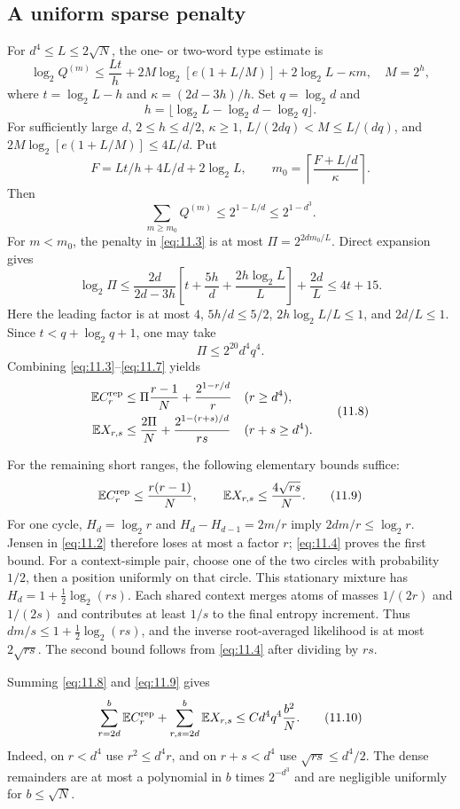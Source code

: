 \documentclass[11pt]{article}
\theoremstyle{remark}
\begin{document}
\subsection{A uniform sparse penalty}
For $d^4\le L\le2\sqrt N$, the one- or two-word type estimate is
\[
 \log_2 Q^{(m)}
 \le \frac{Lt}{h}
 +2M\log_2[e(1+L/M)]+2\log_2L-\kappa m,
 \quad M=2^h,
 \tag{11.5}\label{eq:11.5}
\]
where $t=\log_2L-h$ and $\kappa=(2d-3h)/h$.
Set $q=\log_2d$ and
\[
 h=\lfloor\log_2L-\log_2d-\log_2q\rfloor.
\]
For sufficiently large $d$, $2\le h\le d/2$, $\kappa\ge1$,
$L/(2dq)<M\le L/(dq)$, and
$2M\log_2[e(1+L/M)]\le4L/d$.
Put
\[
 F=Lt/h+4L/d+2\log_2L,
 \qquad m_0=\left\lceil\frac{F+L/d}{\kappa}\right\rceil.
\]
Then
\[
 \sum_{m\ge m_0}Q^{(m)}
 \le2^{1-L/d}\le2^{1-d^3}.
 \tag{11.6}\label{eq:11.6}
\]
For $m<m_0$, the penalty in \eqref{eq:11.3} is at most
$\Pi=2^{2dm_0/L}$. Direct expansion gives
\[
 \log_2\Pi
 \le\frac{2d}{2d-3h}
 \left[t+\frac{5h}{d}+\frac{2h\log_2L}{L}\right]+\frac{2d}{L}
 \le4t+15.
\]
Here the leading factor is at most $4$, $5h/d\le5/2$,
$2h\log_2L/L\le1$, and $2d/L\le1$.
Since $t<q+\log_2q+1$, one may take
\[
 \Pi\le 2^{20}d^4q^4.
 \tag{11.7}\label{eq:11.7}
\]
Combining \eqref{eq:11.3}--\eqref{eq:11.7} yields
\[
 \begin{aligned}
 \mathbb EC_r^{\rm rep}
 &\le\Pi\frac{r-1}{N}+\frac{2^{1-r/d}}r
 &&(r\ge d^4),\\
 \mathbb EX_{r,s}
 &\le\frac{2\Pi}{N}+\frac{2^{1-(r+s)/d}}{rs}
 &&(r+s\ge d^4).
 \end{aligned}
 \tag{11.8}\label{eq:11.8}
\]

For the remaining short ranges, the following elementary bounds suffice:
\[
 \mathbb EC_r^{\rm rep}\le\frac{r(r-1)}N,
 \qquad
 \mathbb EX_{r,s}\le\frac{4\sqrt{rs}}N.
 \tag{11.9}\label{eq:11.9}
\]
For one cycle, $H_d=\log_2r$ and $H_d-H_{d-1}=2m/r$ imply
$2dm/r\le\log_2r$. Jensen in \eqref{eq:11.2} therefore loses at most a
factor $r$; \eqref{eq:11.4} proves the first bound.
For a context-simple pair, choose one of the two circles with probability
$1/2$, then a position uniformly on that circle. This stationary mixture
has $H_d=1+\tfrac12\log_2(rs)$. Each shared context merges atoms of masses
$1/(2r)$ and $1/(2s)$ and contributes at least $1/s$ to the final entropy
increment. Thus $dm/s\le1+\tfrac12\log_2(rs)$, and the inverse root-averaged
likelihood is at most $2\sqrt{rs}$. The second bound follows from
\eqref{eq:11.4} after dividing by $rs$.

Summing \eqref{eq:11.8} and \eqref{eq:11.9} gives
\[
 \sum_{r=2d}^b\mathbb EC_r^{\rm rep}
 +\sum_{r,s=2d}^b\mathbb EX_{r,s}
 \le C d^4q^4\frac{b^2}{N}.
 \tag{11.10}\label{eq:11.10}
\]
Indeed, on $r<d^4$ use $r^2\le d^4r$, and on $r+s<d^4$ use
$\sqrt{rs}\le d^4/2$. The dense remainders are at most a polynomial in $b$
times $2^{-d^3}$ and are negligible uniformly for $b\le\sqrt N$.
\end{document}
